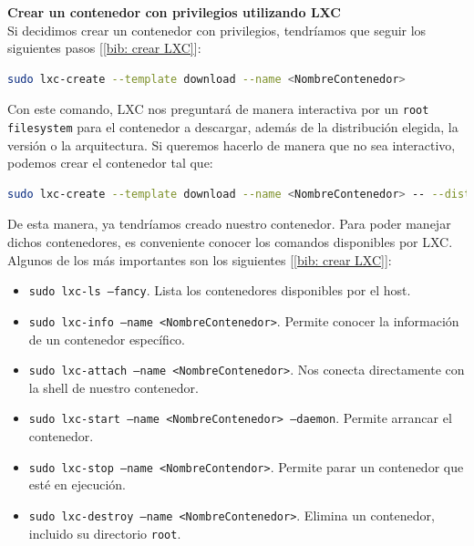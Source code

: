 \documentclass[12pt]{article}
\begin{document}
	\vspace{20px}

	\noindent \textbf{\large Crear un contenedor con privilegios utilizando LXC}\\
	
	\noindent Si decidimos crear un contenedor con privilegios, tendríamos que seguir los siguientes pasos [\ref{bib: crear LXC}]:
	\begin{lstlisting}[language=Bash, caption={Crear un contenedor con privilegios en LXC}]
sudo lxc-create --template download --name <NombreContenedor>
	\end{lstlisting}

	\noindent Con este comando, LXC nos preguntará de manera interactiva por un \texttt{root filesystem} para el contenedor a descargar, además de la distribución elegida, la versión o la arquitectura. Si queremos hacerlo de manera que no sea interactivo, podemos crear el contenedor tal que:
	\begin{lstlisting}[language=Bash, caption={Crear un contendor con privilegios en LXC, modo no interactivo}]
sudo lxc-create --template download --name <NombreContenedor> -- --dist debian --release stretch --arch amd64
	\end{lstlisting}

	\noindent De esta manera, ya tendríamos creado nuestro contenedor. Para poder manejar dichos contenedores, es conveniente conocer los comandos disponibles por LXC. Algunos de los más importantes son los siguientes [\ref{bib: crear LXC}]:
	\begin{itemize}
		\item \texttt{sudo lxc-ls --fancy}. Lista los contenedores disponibles por el host.
		\item \texttt{sudo lxc-info --name <NombreContenedor>}. Permite conocer la información de un contenedor específico.
		\item \texttt{sudo lxc-attach --name <NombreContenedor>}. Nos conecta directamente con la shell de nuestro contenedor.
		\item \texttt{sudo lxc-start --name <NombreContenedor> --daemon}. Permite arrancar el contenedor.
		\item \texttt{sudo lxc-stop --name <NombreContendor>}. Permite parar un contenedor que esté en ejecución.
		\item \texttt{sudo lxc-destroy --name <NombreContenedor>}. Elimina un contenedor, incluido su directorio \texttt{root}.
	\end{itemize}
	
\end{document}
